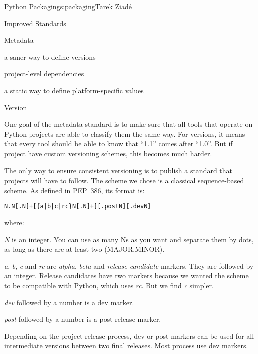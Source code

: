 \begin{aosachapter}{Python Packaging}{s:packaging}{Tarek Ziad\'{e}}
\begin{aosasect1}{Improved Standards}
\begin{aosasect2}{Metadata}
\begin{aosaitemize}
  \item a saner way to define versions

  \item project-level dependencies

  \item a static way to define platform-specific values

\end{aosaitemize}

\begin{aosasect3}{Version}

One goal of the metadata standard is to make sure that all tools that
operate on Python projects are able to classify them the same
way. For versions, it means that every tool should be able to know
that ``1.1'' comes after ``1.0''. But if project have custom
versioning schemes, this becomes much harder.

The only way to ensure consistent versioning is to publish a standard
that projects will have to follow.  The scheme we chose is a
classical sequence-based scheme.  As defined in PEP~386, its format
is:

\begin{verbatim}
N.N[.N]+[{a|b|c|rc}N[.N]+][.postN][.devN]
\end{verbatim}

\noindent where:

\begin{aosaitemize}

  \item \emph{N} is an integer. You can use as many Ns as you want and
  separate them by dots, as long as there are at least two
  (MAJOR.MINOR).

  \item \emph{a}, \emph{b}, \emph{c} and \emph{rc} are \emph{alpha},
  \emph{beta} and \emph{release candidate} markers. They are followed
  by an integer. Release candidates have two markers because we wanted
  the scheme to be compatible with Python, which uses \emph{rc}. But
  we find \emph{c} simpler.

  \item \emph{dev} followed by a number is a dev marker.

  \item \emph{post} followed by a number is a post-release marker.

\end{aosaitemize}

\noindent
Depending on the project release process, dev or post markers can be used for
all intermediate versions between two final releases. Most process use
dev markers.


\end{aosasect3}
\end{aosasect2}
\end{aosasect1}
\end{aosachapter}
